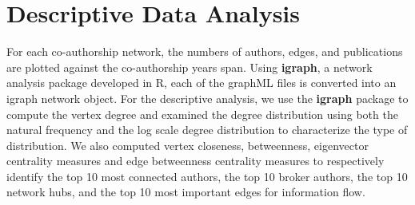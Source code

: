 \section{Descriptive Data Analysis}
For each co-authorship network, the numbers of authors, edges, and publications are plotted against the co-authorship years span. Using \textbf{igraph}, a network analysis package developed in R, each of the graphML files is converted into an igraph network object. For the descriptive analysis, we use the \textbf{igraph} package to compute the vertex degree and examined the degree distribution using both the natural frequency and the log scale degree distribution to characterize the type of distribution. We also computed vertex closeness, betweenness, eigenvector centrality measures and edge betweenness centrality measures to respectively identify the top 10 most connected authors, the top 10 broker authors, the top 10 network hubs, and the top 10 most important edges for information flow.  %

